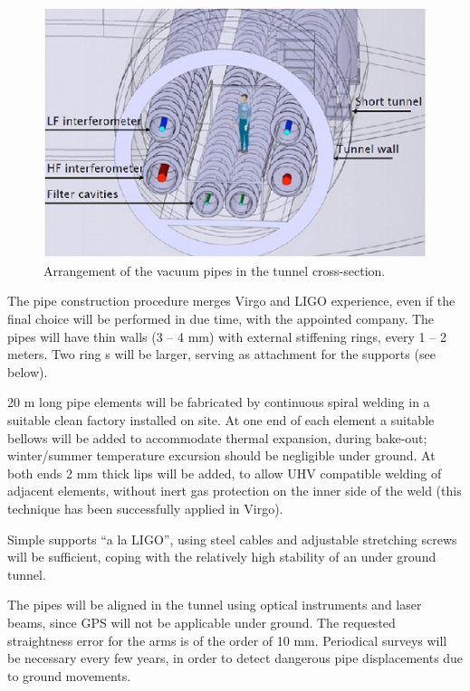 \begin{figure}
\begin{center}
\includegraphics{Sec_SiteInfra/Figures/VAC4.jpg}
\caption{Arrangement of the vacuum pipes in the tunnel cross-section.}
\label{fig:vac4}
\end{center}
\end{figure}

The pipe construction procedure merges Virgo and LIGO experience, even if the final choice will be performed in due time, with the appointed company. The pipes will have thin walls (3 -- 4 mm) with external stiffening rings, every 1 -- 2 meters. Two ring s will be larger, serving as attachment for the supports (see below).

20 m long pipe elements will be fabricated by continuous spiral welding in a suitable clean factory installed on site. At one end of each element a suitable bellows will be added to accommodate thermal expansion, during bake-out; winter/summer temperature excursion should be negligible under ground. At both ends 2 mm thick lips will be added, to allow UHV compatible welding of adjacent elements, without inert gas protection on the inner side of the weld (this technique has been successfully applied in Virgo).

Simple supports ``a la LIGO'', using steel cables and adjustable stretching screws will be sufficient, coping with the relatively high stability of an under ground tunnel.

The pipes will be aligned in the tunnel using optical instruments and laser beams, since GPS will not be applicable under ground. The requested straightness error for the arms is of the order of 10 mm. Periodical surveys will be necessary every few years, in order to detect dangerous pipe displacements due to ground movements.

